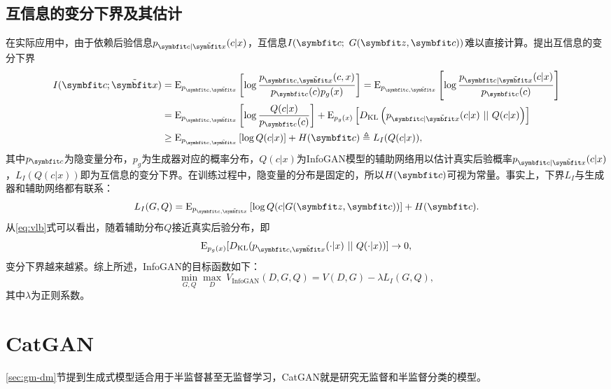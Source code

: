 \subsection{互信息的变分下界及其估计}
在实际应用中，由于依赖后验信息$p_{\bd{c}|\tilde{\bd{x}}}(c|x)$，互信息$I(\bd{c};~G(\bd{z},\bd{c}))$难以直接计算。\citet{poole2019variational}提出互信息的变分下界
\begin{equation}
  \begin{split}
    I(\bd{c}; \tilde{\bd{x}}) 
    &= \E_{ p_{\bd{c},\tilde{\bd{x}}} } \left[ 
      \log \frac{ p_{\bd{c},\tilde{\bd{x}}}(c, x) } 
                { p_{\bd{c}}(c) p_{g}(x) }
              \right] 
      = \E_{ p_{\bd{c},\tilde{\bd{x}}} } \left[ 
      \log \frac{ p_{\bd{c}|\tilde{\bd{x}}}(c|x) }
                { p_{\bd{c}}(c) }
              \right] \\
      &= \E_{ p_{\bd{c}, \tilde{\bd{x}}} } \left[
      \log \frac{ Q(c|x) }
                { p_{\bd{c}}(c) } 
              \right]
    + \E_{p_g(x)} \left[ 
      D_{\text{KL}} \left( p_{\bd{c}|\tilde{\bd{x}}}(c|x) ~||~ Q(c|x)
                    \right)
                  \right] \\
    &\ge \E_{ p_{\bd{c},\tilde{\bd{x}}} } \left[
      \log Q(c|x) \right] + H(\bd{c}) 
      \triangleq L_I(Q(c|x)),
  \end{split}
  \label{eq:vlb}
\end{equation}
其中$p_{\bd{c}}$为隐变量分布，$p_g$为生成器对应的概率分布，$Q(c|x)$为InfoGAN模型的辅助网络用以估计真实后验概率$p_{\bd{c}|\tilde{\bd{x}}}(c|x)$，$L_I(Q(c|x))$即为互信息的变分下界。在训练过程中，隐变量的分布是固定的，所以$H(\bd{c})$可视为常量。事实上，下界$L_I$与生成器和辅助网络都有联系：
\[
  L_I(G,Q) = \E_{ p_{\bd{c},\tilde{\bd{x}}} } \left[
  \log Q(c|G(\bd{z},\bd{c})) \right] + H(\bd{c}).
\]
从\eqref{eq:vlb}式可以看出，随着辅助分布$Q$接近真实后验分布，即
\[
  \E_{p_g(x)}[D_{\text{KL}}(p_{\bd{c},\tilde{\bd{x}}}(\cdot|x) ~||~ Q(\cdot|x))] \to 0,
\]
变分下界越来越紧。综上所述，InfoGAN的目标函数如下：
\begin{equation}
  \min_{G,Q}\max_D ~V_{\text{InfoGAN}}(D,G,Q) = V(D,G) - \lambda L_I(G,Q),
  \label{eq:infogan-obj}
\end{equation}
其中$\lambda$为正则系数。




\section{CatGAN}\label{sec:catgan}
\ref{sec:gm-dm}节提到生成式模型适合用于半监督甚至无监督学习，CatGAN\citep{springenberg2015unsupervised}就是研究无监督和半监督分类的模型。

